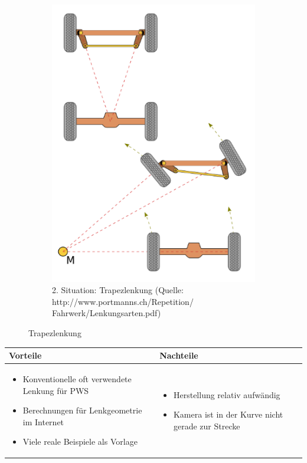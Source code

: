 \begin{figure} [hbp]
\begin{subfigure}[b]{0.36\textwidth}
		\includegraphics[width=\textwidth]{fig/Lenktrapez.png}
		\caption{2. Situation: Trapezlenkung
		(Quelle: http://www.portmanns.ch/Repetition/ \\
		Fahrwerk/Lenkungsarten.pdf)}
\end{subfigure}
	\caption{Trapezlenkung}\label{fig:animals}
\end{figure}

\begin{table}[h]
\begin{tabular}{p{} | p{}}


 \textbf{Vorteile} & \textbf{Nachteile} \\ \hline
	 
\begin{itemize}
\item Konventionelle oft verwendete Lenkung für PWS
\item Berechnungen für Lenkgeometrie im Internet
\item Viele reale Beispiele als Vorlage
\end{itemize}

 
 &
 
\begin{itemize}
\item Herstellung relativ aufwändig
\item Kamera ist in der Kurve nicht gerade zur Strecke
\end{itemize}

\end{tabular}
\end{table}

